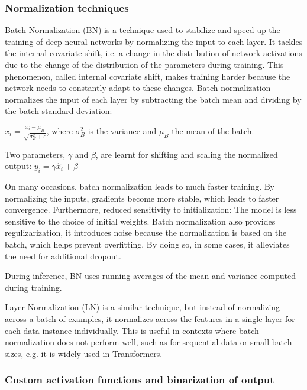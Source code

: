 \subsubsection{Normalization techniques}

Batch Normalization (BN) is a technique used to stabilize and speed up the training of deep neural networks by normalizing the input to each layer. It tackles the internal covariate shift, i.e. a change in the distribution of network activations  due to the change of the distribution of the parameters during training. This phenomenon, called internal covariate shift, makes training harder because the network needs to constantly adapt to these changes.
Batch normalization normalizes the input of each layer by subtracting the batch mean and dividing by the batch standard deviation:

\begin{math}
\hat{x}_i = \frac{x_i - \mu_B}{\sqrt{\sigma_B^2 + \epsilon}}
\end{math},
where $\sigma_B^2$ is the variance and $\mu_B$ the mean of the batch.

Two parameters, $\gamma$ and $\beta$, are learnt for shifting and scaling the normalized output:
\begin{math}
y_i = \gamma \hat{x}_i + \beta
\end{math}
  
On many occasions, batch normalization leads to much faster training. By normalizing the inputs, gradients become more stable, which leads to faster convergence. Furthermore, reduced sensitivity to initialization: The model is less sensitive to the choice of initial weights. Batch normalization also provides regulizarization, it introduces noise because the normalization is based on the batch, which helps prevent overfitting. By doing so, in some cases, it alleviates the need for additional dropout.
        
During inference, BN uses running averages of the mean and variance computed during training.

Layer Normalization (LN) is a similar technique, but instead of normalizing across a batch of examples, it normalizes across the features in a single layer for each data instance individually. This is useful in contexts where batch normalization does not perform well, such as for sequential data or small batch sizes, e.g. it is widely used in Transformers.


\subsubsection{Custom activation functions and binarization of output}

